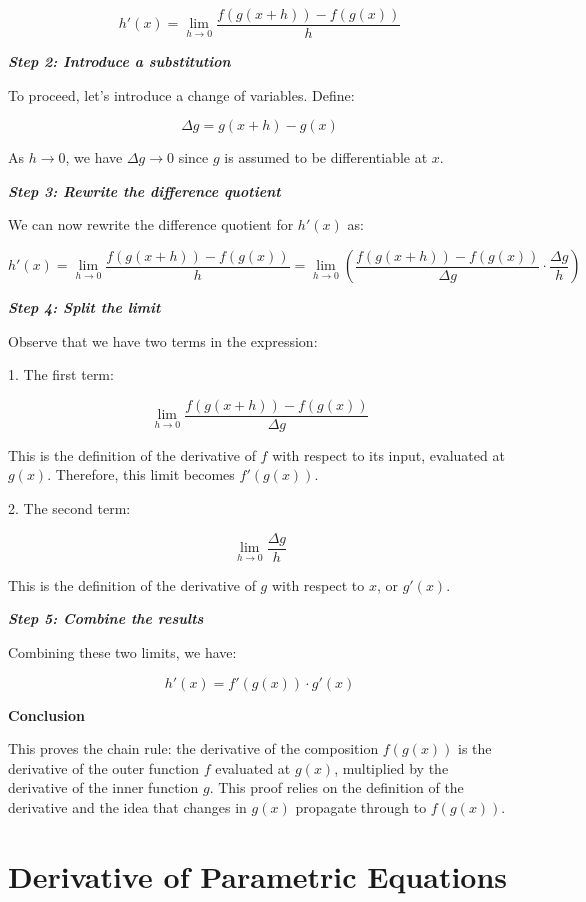 \documentclass[a4paper,12pt]{book}
\begin{document}
\[
h'(x) = \lim_{h \to 0} \dfrac{f(g(x + h)) - f(g(x))}{h}
\]

\textit{\textbf{Step 2: Introduce a substitution}}

To proceed, let’s introduce a change of variables. Define:

\[
\Delta g = g(x + h) - g(x)
\]

As \( h \to 0 \), we have \( \Delta g \to 0 \) since \( g \) is assumed to be differentiable at \( x \).

\textit{\textbf{Step 3: Rewrite the difference quotient}}

We can now rewrite the difference quotient for \( h'(x) \) as:

\[
h'(x) = \lim_{h \to 0} \dfrac{f(g(x + h)) - f(g(x))}{h} = \lim_{h \to 0} \left( \dfrac{f(g(x + h)) - f(g(x))}{\Delta g} \cdot \dfrac{\Delta g}{h} \right)
\]

\textit{\textbf{Step 4: Split the limit}}

Observe that we have two terms in the expression:

1. The first term:

   \[
   \lim_{h \to 0} \dfrac{f(g(x + h)) - f(g(x))}{\Delta g}
   \]
   
   This is the definition of the derivative of \( f \) with respect to its input, evaluated at \( g(x) \). Therefore, this limit becomes \( f'(g(x)) \).

2. The second term:

   \[
   \lim_{h \to 0} \dfrac{\Delta g}{h}
   \]
   
   This is the definition of the derivative of \( g \) with respect to \( x \), or \( g'(x) \).

\textit{\textbf{Step 5: Combine the results}}

Combining these two limits, we have:

\[
h'(x) = f'(g(x)) \cdot g'(x)
\]

\textbf{Conclusion}

This proves the chain rule: the derivative of the composition \( f(g(x)) \) is the derivative of the outer function \( f \) evaluated at \( g(x) \), multiplied by the derivative of the inner function \( g \). This proof relies on the definition of the derivative and the idea that changes in \( g(x) \) propagate through to \( f(g(x)) \).

\section{Derivative of Parametric Equations}
\end{document}
